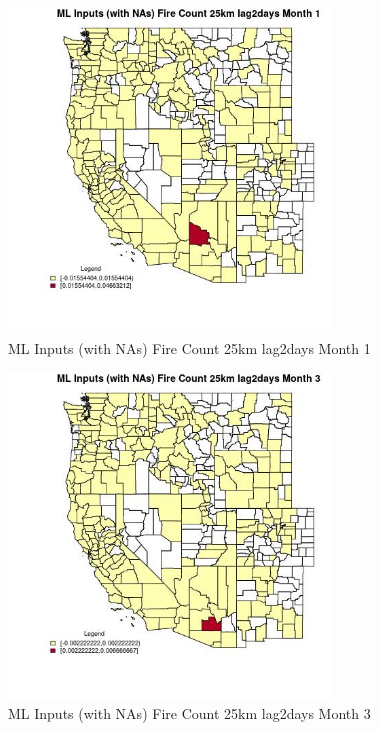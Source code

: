 \begin{figure} 
\centering  
\includegraphics[width=0.77\textwidth]{Code_Outputs/Report_ML_input_PM25_Step4_part_e_de_duplicated_aves_compiled_2019-05-20wNAs_CountyFire_Count_25km_lag2daysmedianMonth1.jpg} 
\caption{\label{fig:Report_ML_input_PM25_Step4_part_e_de_duplicated_aves_compiled_2019-05-20wNAsCountyFire_Count_25km_lag2daysmedianMonth1}ML Inputs (with NAs) Fire Count 25km lag2days Month 1} 
\end{figure} 
 

\begin{figure} 
\centering  
\includegraphics[width=0.77\textwidth]{Code_Outputs/Report_ML_input_PM25_Step4_part_e_de_duplicated_aves_compiled_2019-05-20wNAs_CountyFire_Count_25km_lag2daysmedianMonth3.jpg} 
\caption{\label{fig:Report_ML_input_PM25_Step4_part_e_de_duplicated_aves_compiled_2019-05-20wNAsCountyFire_Count_25km_lag2daysmedianMonth3}ML Inputs (with NAs) Fire Count 25km lag2days Month 3} 
\end{figure} 
 


